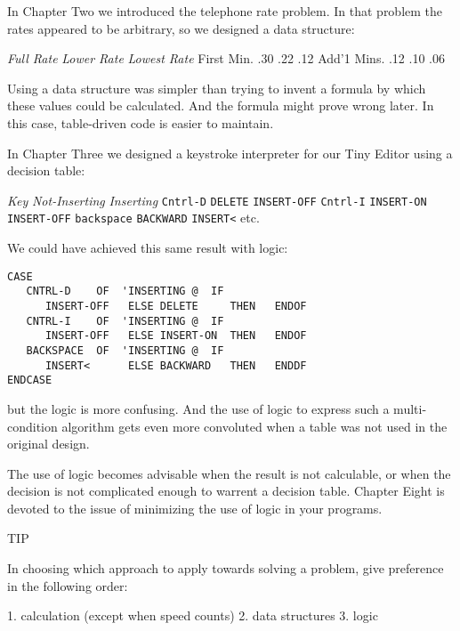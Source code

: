 In Chapter Two we introduced the telephone rate problem. In that
problem the rates appeared to be arbitrary, so we designed a data
structure:

                 \emph{Full Rate}     \emph{Lower Rate}     \emph{Lowest Rate}
First Min.           .30                  .22                   .12
Add'1 Mins.          .12                  .10                   .06

Using a data structure was simpler than trying to invent a formula by
which these values could be calculated. And the formula might prove
wrong later. In this case, table-driven code is easier to maintain.

In Chapter Three we designed a keystroke interpreter for our Tiny
Editor using a decision table:

\emph{Key}           \emph{Not-Inserting}    \emph{Inserting}
\texttt{Cntrl-D}       \texttt{DELETE}           \texttt{INSERT-OFF}
\texttt{Cntrl-I}       \texttt{INSERT-ON}        \texttt{INSERT-OFF}
\texttt{backspace}     \texttt{BACKWARD}         \texttt{INSERT<}
etc.

We could have achieved this same result with logic:

\begin{verbatim}
CASE
   CNTRL-D    OF  'INSERTING @  IF
      INSERT-OFF   ELSE DELETE     THEN   ENDOF
   CNTRL-I    OF  'INSERTING @  IF
      INSERT-OFF   ELSE INSERT-ON  THEN   ENDOF
   BACKSPACE  OF  'INSERTING @  IF
      INSERT<      ELSE BACKWARD   THEN   ENDDF
ENDCASE
\end{verbatim}

but the logic is more confusing. And the use of logic to express such a
multi-condition algorithm gets even more convoluted when a table was
not used in the original design.

The use of logic becomes advisable when the result is not calculable,
or when the decision is not complicated enough to warrent a decision
table. Chapter Eight is devoted to the issue of minimizing the use of logic
in your programs.

TIP

In choosing which approach to apply towards solving a problem, give
preference in the following order:

1. calculation (except when speed counts)
2. data structures
3. logic

